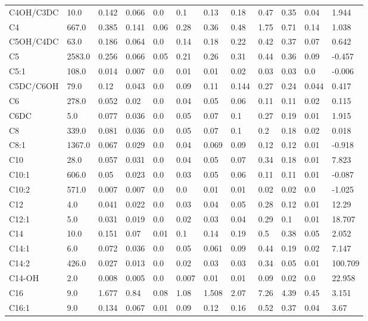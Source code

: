 \begin{tabular}{|l|l|l|l|l|l|l|l|l|l|l|l|}
C4OH/C3DC & 10.0 & 0.142 & 0.066 & 0.0 & 0.1 & 0.13 & 0.18 & 0.47 & 0.35 & 0.04 & 1.944 \\
C4 & 667.0 & 0.385 & 0.141 & 0.06 & 0.28 & 0.36 & 0.48 & 1.75 & 0.71 & 0.14 & 1.038 \\
C5OH/C4DC & 63.0 & 0.186 & 0.064 & 0.0 & 0.14 & 0.18 & 0.22 & 0.42 & 0.37 & 0.07 & 0.642 \\
C5 & 2583.0 & 0.256 & 0.066 & 0.05 & 0.21 & 0.26 & 0.31 & 0.44 & 0.36 & 0.09 & -0.457 \\
C5:1 & 108.0 & 0.014 & 0.007 & 0.0 & 0.01 & 0.01 & 0.02 & 0.03 & 0.03 & 0.0 & -0.006 \\
C5DC/C6OH & 79.0 & 0.12 & 0.043 & 0.0 & 0.09 & 0.11 & 0.144 & 0.27 & 0.24 & 0.044 & 0.417 \\
C6 & 278.0 & 0.052 & 0.02 & 0.0 & 0.04 & 0.05 & 0.06 & 0.11 & 0.11 & 0.02 & 0.115 \\
C6DC & 5.0 & 0.077 & 0.036 & 0.0 & 0.05 & 0.07 & 0.1 & 0.27 & 0.19 & 0.01 & 1.915 \\
C8 & 339.0 & 0.081 & 0.036 & 0.0 & 0.05 & 0.07 & 0.1 & 0.2 & 0.18 & 0.02 & 0.018 \\
C8:1 & 1367.0 & 0.067 & 0.029 & 0.0 & 0.04 & 0.069 & 0.09 & 0.12 & 0.12 & 0.01 & -0.918 \\
C10 & 28.0 & 0.057 & 0.031 & 0.0 & 0.04 & 0.05 & 0.07 & 0.34 & 0.18 & 0.01 & 7.823 \\
C10:1 & 606.0 & 0.05 & 0.023 & 0.0 & 0.03 & 0.05 & 0.06 & 0.11 & 0.11 & 0.01 & -0.087 \\
C10:2 & 571.0 & 0.007 & 0.007 & 0.0 & 0.0 & 0.01 & 0.01 & 0.02 & 0.02 & 0.0 & -1.025 \\
C12 & 4.0 & 0.041 & 0.022 & 0.0 & 0.03 & 0.04 & 0.05 & 0.28 & 0.12 & 0.01 & 12.29 \\
C12:1 & 5.0 & 0.031 & 0.019 & 0.0 & 0.02 & 0.03 & 0.04 & 0.29 & 0.1 & 0.01 & 18.707 \\
C14 & 10.0 & 0.151 & 0.07 & 0.01 & 0.1 & 0.14 & 0.19 & 0.5 & 0.38 & 0.05 & 2.052 \\
C14:1 & 6.0 & 0.072 & 0.036 & 0.0 & 0.05 & 0.061 & 0.09 & 0.44 & 0.19 & 0.02 & 7.147 \\
C14:2 & 426.0 & 0.027 & 0.013 & 0.0 & 0.02 & 0.03 & 0.03 & 0.34 & 0.05 & 0.01 & 100.709 \\
C14-OH & 2.0 & 0.008 & 0.005 & 0.0 & 0.007 & 0.01 & 0.01 & 0.09 & 0.02 & 0.0 & 22.958 \\
C16 & 9.0 & 1.677 & 0.84 & 0.08 & 1.08 & 1.508 & 2.07 & 7.26 & 4.39 & 0.45 & 3.151 \\
C16:1 & 9.0 & 0.134 & 0.067 & 0.01 & 0.09 & 0.12 & 0.16 & 0.52 & 0.37 & 0.04 & 3.67 \\

\end{tabular}
